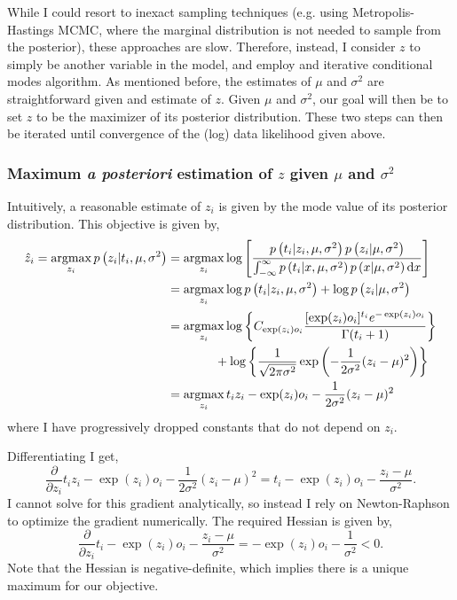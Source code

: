 \documentclass[11pt]{article}
\newcommand{\argmax}{\operatornamewithlimits{argmax}}
\begin{document}
While I could resort to inexact sampling techniques (e.g. using Metropolis-Hastings MCMC, where the marginal distribution is not needed to sample from the posterior), these approaches are slow. Therefore, instead, I consider $z$ to simply be another variable in the model, and employ and iterative conditional modes algorithm. As mentioned before, the estimates of $\mu$ and $\sigma^2$ are straightforward given and estimate of $z$. Given $\mu$ and $\sigma^2$, our goal will then be to set $z$ to be the maximizer of its posterior distribution. These two steps can then be iterated until convergence of the (log) data likelihood given above.

\subsubsection{Maximum \emph{a posteriori} estimation of $z$ given $\mu$ and $\sigma^2$}

Intuitively, a reasonable estimate of $z_i$ is given by the mode value of its posterior distribution. This objective is given by,
\begin{align*}
\hat{z}_i = \argmax_{z_i} p\left(z_i|t_i,\mu, \sigma^2 \right) & = \argmax_{z_i} \log \left[ \frac{ p\left(t_i|z_i,\mu, \sigma^2 \right)p\left(z_i |\mu, \sigma^2 \right) }{ \int_{-\infty}^{\infty} p\left(t_i|x,\mu, \sigma^2 \right)p\left(x |\mu, \sigma^2 \right) \textrm{d}x } \right] \\
& = \argmax_{z_i} \log  p\left(t_i|z_i,\mu, \sigma^2 \right) + \log p\left(z_i |\mu, \sigma^2 \right)  \\
& = \argmax_{z_i} \log\left\{ C_{\exp(z_i)o_i} \frac{ [\exp(z_i)o_i]^{t_i} e^{-\exp(z_i)o_i}}{\Gamma(t_i + 1)}\right\} \\ 
& \hspace{13.5mm} + \log\left\{ \frac{1}{\sqrt{2\pi\sigma^2}} \exp\left( -\frac{1}{2\sigma^2}(z_i - \mu)^2 \right) \right\} \\
& = \argmax_{z_i} t_i z_i - \exp(z_i)o_i -\frac{1}{2\sigma^2}(z_i - \mu)^2 
\end{align*}
where I have progressively dropped constants that do not depend on $z_i$. 

Differentiating I get, 
\[
\frac{\partial}{\partial z_i} t_i z_i - \exp(z_i)o_i -\frac{1}{2\sigma^2}(z_i - \mu)^2 = t_i - \exp(z_i)o_i -\frac{z_i - \mu}{\sigma^2}.
\]
I cannot solve for this gradient analytically, so instead I rely on Newton-Raphson to optimize the gradient numerically. The required Hessian is given by,
\[
\frac{\partial}{\partial z_i} t_i - \exp(z_i)o_i -\frac{z_i - \mu}{\sigma^2} = - \exp(z_i)o_i -\frac{1}{\sigma^2} < 0 .
\]
Note that the Hessian is negative-definite, which implies there is a unique maximum for our objective.  
\end{document}
